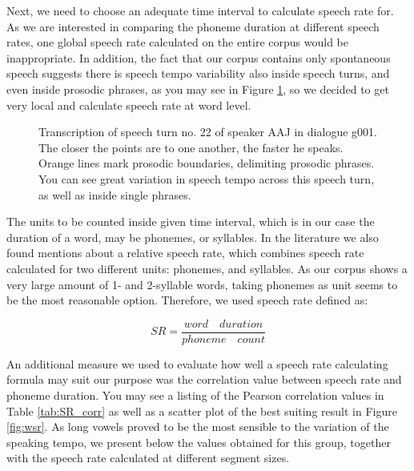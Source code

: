 \documentclass[11pt,a4paper]{scrbook}
\begin{document}
Next, we need to choose an adequate time interval to calculate speech rate for. As we are interested in comparing the phoneme duration at different speech rates, one global speech rate calculated on the entire corpus would be inappropriate. In addition, the fact that our corpus contains only spontaneous speech suggests there is speech tempo variability also inside speech turns, and even inside prosodic phrases, as you may see in Figure \ref{fig:SR_example}, so we decided to get very local and calculate speech rate at word level. 

\begin{figure}[htbp]
	\centering
	\noindent{}
	\vspace{-25mm}
	\caption[Example of speech rate variation inside a turn]{Transcription of speech turn no. 22 of speaker AAJ in dialogue g001. The closer the points are to one another, the faster he speaks. Orange lines mark prosodic boundaries, delimiting prosodic phrases. You can see great variation in speech tempo across this speech turn, as well as inside single phrases.}
	\label{fig:SR_example}
\end{figure}

The units to be counted inside given time interval, which is in our case the duration of a word, may be phonemes, or syllables. In the literature \cite{Pfitzinger1998} we also found mentions about a relative speech rate, which combines speech rate calculated for two different units: phonemes, and syllables. As our corpus shows a very large amount of 1- and 2-syllable words, taking phonemes as unit seems to be the most reasonable option. Therefore, we used speech rate defined as: 

\begin{equation}
\label{eq:eq1}
	SR = \frac{word \quad duration}{phoneme\quad count}
\end{equation}

An additional measure we used to evaluate how well a speech rate calculating formula may suit our purpose was the correlation value between speech rate and phoneme duration. You may see a listing of the Pearson correlation values in Table \ref{tab:SR_corr} as well as a scatter plot of the best suiting result in Figure \ref{fig:wsr}. As long vowels proved to be the most sensible to the variation of the speaking tempo, we present below the values obtained for this group, together with the speech rate calculated at different segment sizes.
\end{document}
